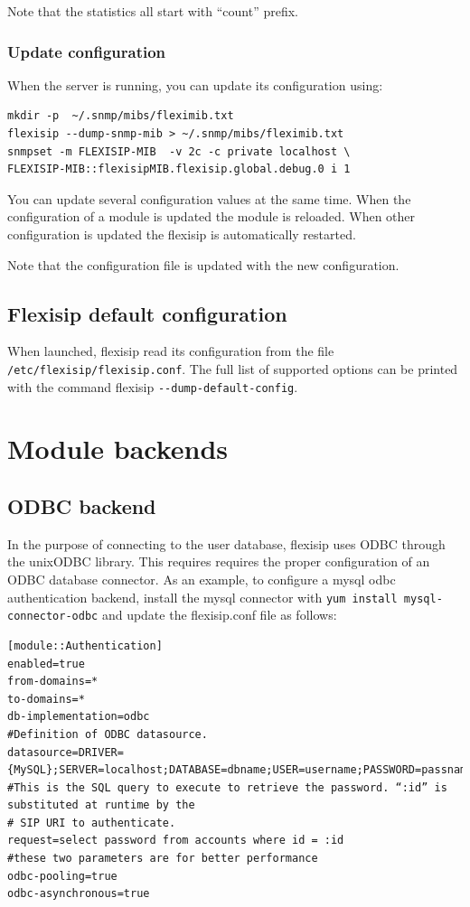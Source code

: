 \documentclass[a4paper,10pt]{article}
\begin{document}
Note that the statistics all start with “count” prefix.


\subsubsection{Update configuration}
When the server is running, you can update its configuration using:
\begin{verbatim}
mkdir -p  ~/.snmp/mibs/fleximib.txt
flexisip --dump-snmp-mib > ~/.snmp/mibs/fleximib.txt
snmpset -m FLEXISIP-MIB  -v 2c -c private localhost \
FLEXISIP-MIB::flexisipMIB.flexisip.global.debug.0 i 1
\end{verbatim}

You can update several configuration values at the same time.
When the configuration of a module is updated the module is reloaded.
When other configuration is updated the flexisip is automatically restarted.

Note that the configuration file is updated with the new configuration.


\subsection{Flexisip default configuration}
When launched, flexisip read its configuration from the file \verb|/etc/flexisip/flexisip.conf|.
The full list of supported options can be printed with the command flexisip \verb|--dump-default-config|.


\section{Module backends}


\subsection{ODBC backend}
In the purpose of connecting to the user database, flexisip uses ODBC through the unixODBC library.
This requires requires the proper configuration of an ODBC database connector.
As an example, to configure a mysql odbc authentication backend, install the mysql connector with \verb|yum install mysql-connector-odbc|
and update the flexisip.conf file as follows:


\begin{verbatim} 
[module::Authentication]
enabled=true
from-domains=*
to-domains=*
db-implementation=odbc
#Definition of ODBC datasource.
datasource=DRIVER={MySQL};SERVER=localhost;DATABASE=dbname;USER=username;PASSWORD=passname;OPTION=3;
#This is the SQL query to execute to retrieve the password. “:id” is substituted at runtime by the 
# SIP URI to authenticate.
request=select password from accounts where id = :id
#these two parameters are for better performance
odbc-pooling=true
odbc-asynchronous=true
\end{verbatim} 
\end{document}
